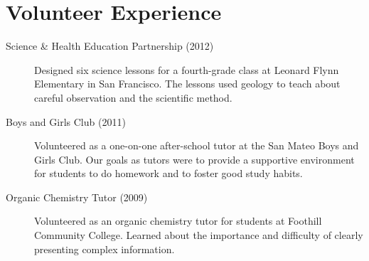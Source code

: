 \section{Volunteer Experience}

\begin{description}

\item[Science \& Health Education Partnership (2012)]
        Designed six science lessons for a fourth-grade class at Leonard Flynn 
        Elementary in San Francisco.  The lessons used geology to teach about 
        careful observation and the scientific method.  

\item[Boys and Girls Club (2011)]
        Volunteered as a one-on-one after-school tutor at the San Mateo Boys 
        and Girls Club.  Our goals as tutors were to provide a supportive 
        environment for students to do homework and to foster good study 
        habits.

\item[Organic Chemistry Tutor (2009)]
        Volunteered as an organic chemistry tutor for students at Foothill 
        Community College.  Learned about the importance and difficulty of 
        clearly presenting complex information.

\end{description}
